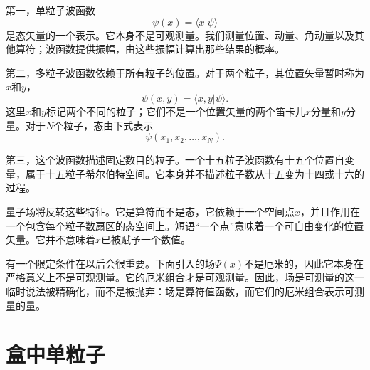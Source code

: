 第一，单粒子波函数
\begin{equation}
\psi(x)=\langle x|\psi\rangle
\end{equation}
是态矢量的一个表示。它本身不是可观测量。我们测量位置、动量、角动量以及其他算符；波函数提供振幅，由这些振幅计算出那些结果的概率。

第二，多粒子波函数依赖于所有粒子的位置。对于两个粒子，其位置矢量暂时称为\(x\)和\(y\)，
\begin{equation}
\psi(x,y)=\langle x,y|\psi\rangle.
\end{equation}
这里\(x\)和\(y\)标记两个不同的粒子；它们不是一个位置矢量的两个笛卡儿\(x\)分量和\(y\)分量。对于\(N\)个粒子，态由下式表示
\begin{equation}
\psi(x_1,x_2,\ldots,x_N).
\end{equation}

第三，这个波函数描述固定数目的粒子。一个十五粒子波函数有十五个位置自变量，属于十五粒子希尔伯特空间。它本身并不描述粒子数从十五变为十四或十六的过程。

量子场将反转这些特征。它是算符而不是态，它依赖于一个空间点\(x\)，并且作用在一个包含每个粒子数扇区的态空间上。短语``一个点''意味着一个可自由变化的位置矢量。它并不意味着\(x\)已被赋予一个数值。

有一个限定条件在以后会很重要。下面引入的场\(\Psi(x)\)不是厄米的，因此它本身在严格意义上不是可观测量。它的厄米组合才是可观测量。因此，场是可测量的这一临时说法被精确化，而不是被抛弃：场是算符值函数，而它们的厄米组合表示可测量的量。

\begin{classroomqa}
\end{classroomqa}

\begin{classroomqa}
\end{classroomqa}

\section{盒中单粒子}

